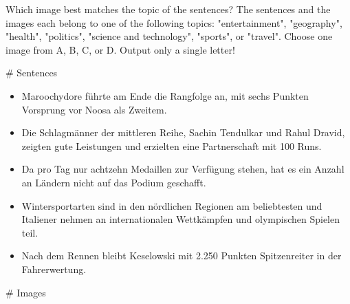 \begin{figure*}[ht]
\begin{tcolorbox}[
    colback=white!95!black,    %
    colframe=black,            %
    title=Sentences-To-Images (\sti), %
    fonttitle=\bfseries,       %
    boxrule=0.5pt,             %
    arc=4pt,                   %
    outer arc=4pt,
    width=\textwidth,          %
    before skip=1em,           %
    after skip=1em,            %
]

Which image best matches the topic of the sentences?
The sentences and the images each belong to one of the following topics: 
"entertainment", "geography", "health", "politics", "science and technology", "sports", or "travel". 
Choose one image from A, B, C, or D. Output only a single letter!

\medskip

\# Sentences

\begin{itemize}[itemsep=0pt,topsep=2pt]
    \item \textasciigrave\textasciigrave\textasciigrave Maroochydore führte am Ende die Rangfolge an, mit sechs Punkten Vorsprung vor Noosa
 als Zweitem.\textasciigrave\textasciigrave\textasciigrave
    \item \textasciigrave\textasciigrave\textasciigrave 
    Die Schlagmänner der mittleren Reihe, Sachin Tendulkar und Rahul Dravid, zeigten gute Leistungen und erzielten eine Partnerschaft mit 100 Runs.\textasciigrave\textasciigrave\textasciigrave 
    \item \textasciigrave\textasciigrave\textasciigrave 
    Da pro Tag nur achtzehn Medaillen zur Verfügung stehen, hat es ein Anzahl an Ländern nicht auf das Podium geschafft.\textasciigrave\textasciigrave\textasciigrave 
    \item \textasciigrave\textasciigrave\textasciigrave 
    Wintersportarten sind in den nördlichen Regionen am beliebtesten und Italiener nehmen an internationalen Wettkämpfen und olympischen Spielen teil.\textasciigrave\textasciigrave\textasciigrave 
    \item \textasciigrave\textasciigrave\textasciigrave 
    Nach dem Rennen bleibt Keselowski mit 2.250 Punkten Spitzenreiter in der Fahrerwertung.
\end{itemize}

\medskip

\# Images


\end{tcolorbox}
\end{figure*}
